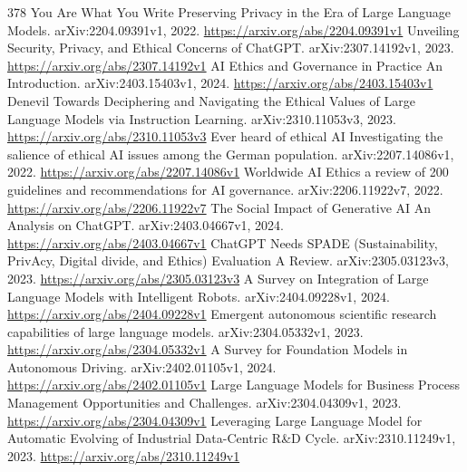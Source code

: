 \documentclass[11pt]{article}
\begin{document}
\begin{thebibliography}{378}
 You Are What You Write Preserving Privacy in the Era of Large Language Models. arXiv:2204.09391v1, 2022. \url{https://arxiv.org/abs/2204.09391v1}
 Unveiling Security, Privacy, and Ethical Concerns of ChatGPT. arXiv:2307.14192v1, 2023. \url{https://arxiv.org/abs/2307.14192v1}
 AI Ethics and Governance in Practice An Introduction. arXiv:2403.15403v1, 2024. \url{https://arxiv.org/abs/2403.15403v1}
 Denevil Towards Deciphering and Navigating the Ethical Values of Large Language Models via Instruction Learning. arXiv:2310.11053v3, 2023. \url{https://arxiv.org/abs/2310.11053v3}
 Ever heard of ethical AI Investigating the salience of ethical AI issues among the German population. arXiv:2207.14086v1, 2022. \url{https://arxiv.org/abs/2207.14086v1}
 Worldwide AI Ethics a review of 200 guidelines and recommendations for AI governance. arXiv:2206.11922v7, 2022. \url{https://arxiv.org/abs/2206.11922v7}
 The Social Impact of Generative AI An Analysis on ChatGPT. arXiv:2403.04667v1, 2024. \url{https://arxiv.org/abs/2403.04667v1}
 ChatGPT Needs SPADE (Sustainability, PrivAcy, Digital divide, and Ethics) Evaluation A Review. arXiv:2305.03123v3, 2023. \url{https://arxiv.org/abs/2305.03123v3}
 A Survey on Integration of Large Language Models with Intelligent Robots. arXiv:2404.09228v1, 2024. \url{https://arxiv.org/abs/2404.09228v1}
 Emergent autonomous scientific research capabilities of large language models. arXiv:2304.05332v1, 2023. \url{https://arxiv.org/abs/2304.05332v1}
 A Survey for Foundation Models in Autonomous Driving. arXiv:2402.01105v1, 2024. \url{https://arxiv.org/abs/2402.01105v1}
 Large Language Models for Business Process Management Opportunities and Challenges. arXiv:2304.04309v1, 2023. \url{https://arxiv.org/abs/2304.04309v1}
 Leveraging Large Language Model for Automatic Evolving of Industrial Data-Centric R\&D Cycle. arXiv:2310.11249v1, 2023. \url{https://arxiv.org/abs/2310.11249v1}
\end{thebibliography}
\end{document}
